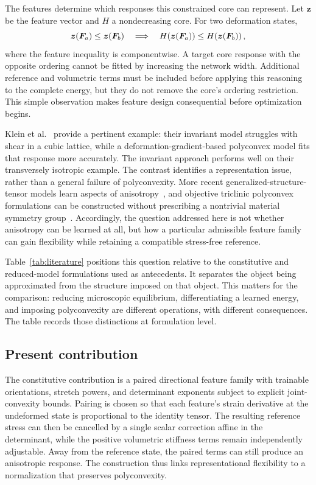 The features determine which responses this constrained core can represent. Let $\bm z$ be the feature vector and $H$ a nondecreasing core. For two deformation states,
\[
 \bm z(\bm F_a)\leq\bm z(\bm F_b)
 \quad\Longrightarrow\quad
 H\!\left(\bm z(\bm F_a)\right)\leq H\!\left(\bm z(\bm F_b)\right),
\]
where the feature inequality is componentwise. A target core response with the opposite ordering cannot be fitted by increasing the network width. Additional reference and volumetric terms must be included before applying this reasoning to the complete energy, but they do not remove the core's ordering restriction. This simple observation makes feature design consequential before optimization begins.

Klein et al.~\cite{klein2022} provide a pertinent example: their invariant model struggles with shear in a cubic lattice, while a deformation-gradient-based polyconvex model fits that response more accurately. The invariant approach performs well on their transversely isotropic example. The contrast identifies a representation issue, rather than a general failure of polyconvexity. More recent generalized-structure-tensor models learn aspects of anisotropy~\cite{Kalina2024}, and objective triclinic polyconvex formulations can be constructed without prescribing a nontrivial material symmetry group~\cite{klein2026}. Accordingly, the question addressed here is not whether anisotropy can be learned at all, but how a particular admissible feature family can gain flexibility while retaining a compatible stress-free reference.

Table~\ref{tab:literature} positions this question relative to the constitutive and reduced-model formulations used as antecedents. It separates the object being approximated from the structure imposed on that object. This matters for the comparison: reducing microscopic equilibrium, differentiating a learned energy, and imposing polyconvexity are different operations, with different consequences. The table records those distinctions at formulation level.



\subsection{Present contribution}
The constitutive contribution is a paired directional feature family with trainable orientations, stretch powers, and determinant exponents subject to explicit joint-convexity bounds. Pairing is chosen so that each feature's strain derivative at the undeformed state is proportional to the identity tensor. The resulting reference stress can then be cancelled by a single scalar correction affine in the determinant, while the positive volumetric stiffness terms remain independently adjustable. Away from the reference state, the paired terms can still produce an anisotropic response. The construction thus links representational flexibility to a normalization that preserves polyconvexity.

